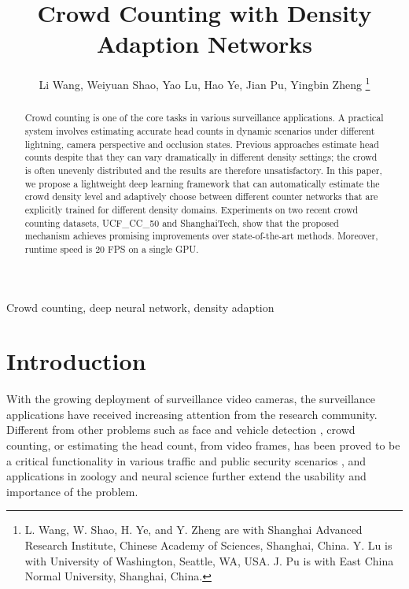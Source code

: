 \documentclass[journal]{IEEEtran}
\begin{document}
\title{Crowd Counting with Density Adaption Networks}

\author{Li Wang, Weiyuan Shao, Yao Lu, Hao Ye, Jian Pu, Yingbin Zheng
\vspace{-0.3in}
\thanks{L. Wang, W. Shao, H. Ye, and Y. Zheng are with Shanghai Advanced Research Institute, Chinese Academy of Sciences, Shanghai, China. Y. Lu is with University of Washington, Seattle, WA, USA. J. Pu is with East China Normal University, Shanghai, China.
}
}

\maketitle

\begin{abstract}

Crowd counting is one of the core tasks in various surveillance applications. A practical system involves estimating accurate head counts in dynamic scenarios under different lightning, camera perspective and occlusion states. Previous approaches estimate head counts despite that they can vary dramatically in different density settings; the crowd is often unevenly distributed and the results are therefore unsatisfactory. In this paper, we propose a lightweight deep learning framework that can automatically estimate the crowd density level and adaptively choose between different counter networks that are explicitly trained for different density domains. Experiments on two recent crowd counting datasets, UCF\_CC\_50 and ShanghaiTech, show that the proposed mechanism achieves promising improvements over state-of-the-art methods. Moreover, runtime speed is 20 FPS on a single GPU. 

\end{abstract}

\begin{IEEEkeywords}
Crowd counting, deep neural network, density adaption
\end{IEEEkeywords}

\IEEEpeerreviewmaketitle

\section{Introduction}
With the growing deployment of surveillance video cameras, the surveillance applications have received increasing attention from the research community.
Different from other problems such as face and vehicle detection \cite{2016spl_kzhang,wang2017evolving,lyu2017ua},
crowd counting, or estimating the head count, from video frames, has been proved to be a critical functionality in various traffic and public security scenarios \cite{Zhang:2015id,Zhang:2016fr,sam2017switching,Sindagi:2017vv,zhang2017fcn,Xiong:2017ug,kumagai2017mixture}, and applications in zoology \cite{arteta2016counting} and neural science \cite{Xie:2015wr} further extend the usability and importance of the problem.
\end{document}

